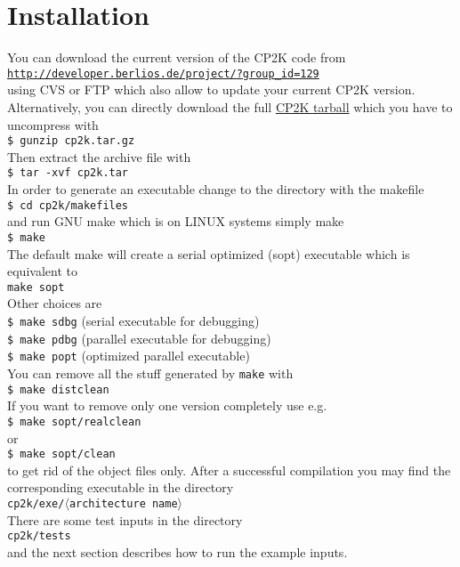 \documentclass[12pt,twoside]{article}
\newcommand{\la}{$\langle$}
\newcommand{\ra}{$\rangle$}
\begin{document}
\section{Installation}
%
You can download the current version of the CP2K code from\\[2mm]
\href{http://developer.berlios.de/project/?group_id=129}
     {\tt http://developer.berlios.de/project/?group\_id=129}\\[2mm]
using CVS or FTP which also allow to update your current CP2K version.
Alternatively, you can directly download the full
\href{http://cvs.berlios.de/cgi-bin/viewcvs.cgi/cp2k/cp2k.tar.gz?tarball=1}
     {CP2K tarball} which you have to uncompress with\\[2mm]
{\tt \$ gunzip cp2k.tar.gz}\\[2mm]
Then extract the archive file with\\[2mm]
{\tt \$ tar -xvf cp2k.tar}\\[2mm]
In order to generate an executable change to the directory
with the makefile\\[2mm]
{\tt \$ cd cp2k/makefiles}\\[2mm]
and run GNU make which is on LINUX systems simply make\\[2mm]
{\tt \$ make}\\[2mm]
The default make will create a serial optimized (sopt) executable which
is equivalent to\\[2mm]
{\tt make sopt}\\[2mm]
Other choices are\\[2mm]
{\tt \$ make sdbg} (serial executable for debugging)\\[2mm]
{\tt \$ make pdbg} (parallel executable for debugging)\\[2mm]
{\tt \$ make popt} (optimized parallel executable)\\[2mm]
You can remove all the stuff generated by {\tt make} with\\[2mm]
{\tt \$ make distclean}\\[2mm]
If you want to remove only one version completely use e.g.\\[2mm]
{\tt \$ make sopt/realclean}\\[2mm]
or\\[2mm]
{\tt \$ make sopt/clean}\\[2mm]
to get rid of the object files only.
After a successful compilation you may find the corresponding executable
in the directory\\[2mm]
{\tt cp2k/exe/\la{\rm architecture name}\ra}\\[2mm]
There are some test inputs in the directory\\[2mm]
{\tt cp2k/tests}\\[2mm]
and the next section describes how to run the example inputs.
\newpage
%
\end{document}
